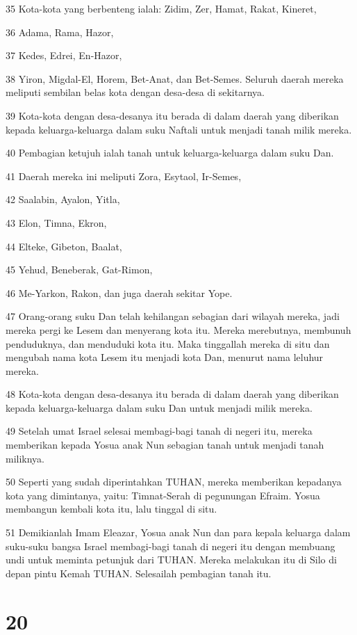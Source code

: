 \par 35 Kota-kota yang berbenteng ialah: Zidim, Zer, Hamat, Rakat, Kineret,
\par 36 Adama, Rama, Hazor,
\par 37 Kedes, Edrei, En-Hazor,
\par 38 Yiron, Migdal-El, Horem, Bet-Anat, dan Bet-Semes. Seluruh daerah mereka meliputi sembilan belas kota dengan desa-desa di sekitarnya.
\par 39 Kota-kota dengan desa-desanya itu berada di dalam daerah yang diberikan kepada keluarga-keluarga dalam suku Naftali untuk menjadi tanah milik mereka.
\par 40 Pembagian ketujuh ialah tanah untuk keluarga-keluarga dalam suku Dan.
\par 41 Daerah mereka ini meliputi Zora, Esytaol, Ir-Semes,
\par 42 Saalabin, Ayalon, Yitla,
\par 43 Elon, Timna, Ekron,
\par 44 Elteke, Gibeton, Baalat,
\par 45 Yehud, Beneberak, Gat-Rimon,
\par 46 Me-Yarkon, Rakon, dan juga daerah sekitar Yope.
\par 47 Orang-orang suku Dan telah kehilangan sebagian dari wilayah mereka, jadi mereka pergi ke Lesem dan menyerang kota itu. Mereka merebutnya, membunuh penduduknya, dan menduduki kota itu. Maka tinggallah mereka di situ dan mengubah nama kota Lesem itu menjadi kota Dan, menurut nama leluhur mereka.
\par 48 Kota-kota dengan desa-desanya itu berada di dalam daerah yang diberikan kepada keluarga-keluarga dalam suku Dan untuk menjadi milik mereka.
\par 49 Setelah umat Israel selesai membagi-bagi tanah di negeri itu, mereka memberikan kepada Yosua anak Nun sebagian tanah untuk menjadi tanah miliknya.
\par 50 Seperti yang sudah diperintahkan TUHAN, mereka memberikan kepadanya kota yang dimintanya, yaitu: Timnat-Serah di pegunungan Efraim. Yosua membangun kembali kota itu, lalu tinggal di situ.
\par 51 Demikianlah Imam Eleazar, Yosua anak Nun dan para kepala keluarga dalam suku-suku bangsa Israel membagi-bagi tanah di negeri itu dengan membuang undi untuk meminta petunjuk dari TUHAN. Mereka melakukan itu di Silo di depan pintu Kemah TUHAN. Selesailah pembagian tanah itu.

\chapter{20}

